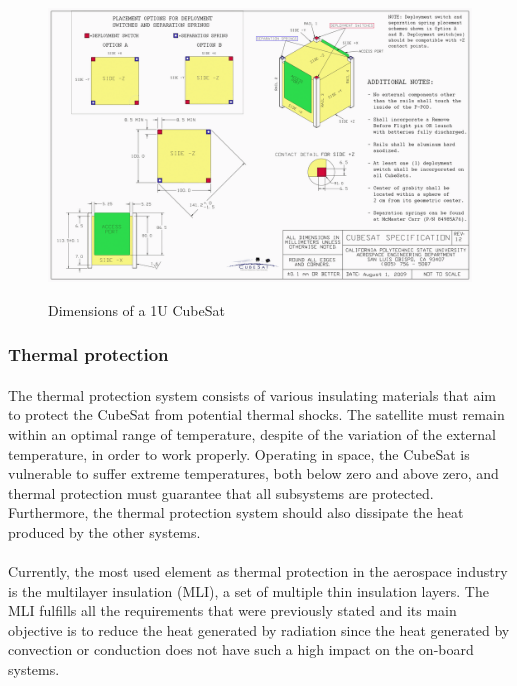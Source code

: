 \begin{figure}[h!]
\includegraphics[scale=0.6]{./sections/SatelliteDesign/images/CubeSatDesign}
\centering
\caption{Dimensions of a 1U CubeSat}
\cite{cubesatdimensions}
\end{figure}

\subsubsection{Thermal protection}
\paragraph{}The thermal protection system consists of various insulating materials that aim to protect the CubeSat from potential thermal shocks. The satellite must remain within an optimal range of temperature, despite of the variation of the external temperature, in order to work properly. Operating in space, the CubeSat is vulnerable to suffer extreme temperatures, both below zero and above zero, and thermal protection must guarantee that all subsystems are protected. Furthermore, the thermal protection system should also dissipate the heat produced by the other systems.

\paragraph{} Currently, the most used element as thermal protection in the aerospace industry is the multilayer insulation (MLI), a set of multiple thin insulation layers. The MLI fulfills all the requirements that were previously stated and its main objective is to reduce the heat generated by radiation since the heat generated by convection or conduction does not have such a high impact on the on-board systems.


